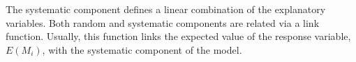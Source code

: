 %
The systematic component defines a linear combination of the explanatory variables.
Both random and systematic components are related via a link function.
Usually, this function links the expected value of the response variable, $E(M_i)$, with the systematic component of the model.
